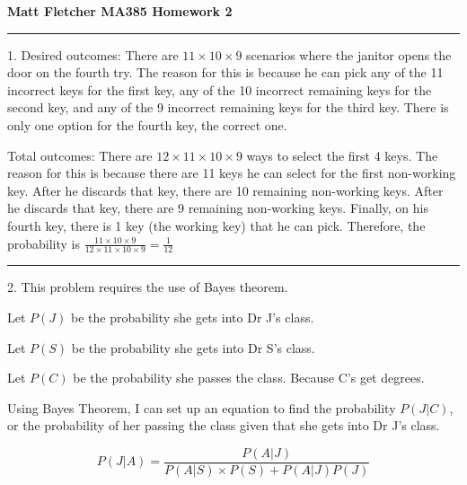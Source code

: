 \documentclass{article}
\begin{document}
	

\thispagestyle{empty}

\let\oldemptyset\emptyset
\let\emptyset\varnothing


\newcommand*{\Perm}[2]{{}^{#1}\!P_{#2}}
\newcommand*{\Comb}[2]{{}^{#1}C_{#2}}


	
\textbf{	Matt Fletcher MA385 Homework 2}
\smallskip

\noindent\rule{8cm}{0.4pt}

1. 
Desired outcomes: There are $11\times10\times9$ scenarios where the janitor opens the door on the fourth try. The reason for this is because he can pick any of the 11 incorrect keys for the first key, any of the 10 incorrect remaining keys for the second key, and any of the 9 incorrect remaining keys for the third key. There is only one option for the fourth key, the correct one. 

Total outcomes: There are $12 \times 11 \times 10 \times 9 $ ways to select the first 4 keys. The reason for this is because there are 11 keys he can select for the first non-working key. After he discards that key, there are 10 remaining non-working keys. After he discards that key, there are 9 remaining non-working keys. Finally, on his fourth key, there is 1 key (the working key) that he can pick. Therefore, the probability is $\frac{11\times10\times9}{12\times11\times10\times9} = \boxed{\frac{1}{12}}$

\noindent\rule{8cm}{0.4pt}

2. This problem requires the use of Bayes theorem. 

Let $P(J)$ be the probability she gets into Dr J's class. 

Let $P(S)$ be the probability she gets into Dr S's class. 

Let $P(C)$ be the probability she passes the class. Because C's get degrees. 

Using Bayes Theorem, I can set up an equation to find the probability $P(J|C)$, or the probability of her passing the class given that she gets into Dr J's class. 


\[P(J|A) = \frac{P(A|J)}{P(A|S) \times P(S) + P(A|J) P(J)}\]
\end{document}
